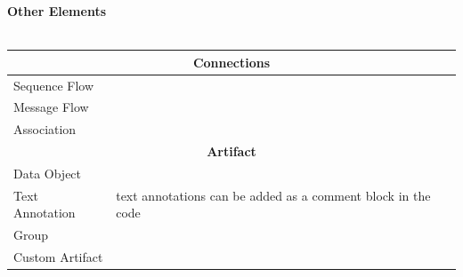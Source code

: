 	\textbf{\Large{Other Elements}}\\\\
		\begin{tabularx}{\linewidth}{|l|X|}\hline\hline
		\multicolumn{2}{|c|}{\textbf{Connections}}\\\hline\hline
		Sequence Flow & \\\hline
		Message Flow& \\\hline
		Association & \\\hline\hline
		\multicolumn{2}{|c|}{\textbf{Artifact}}\\\hline\hline
		Data Object & \\\hline
		Text Annotation & text annotations can be added as a comment block in the code \\\hline
		Group & \\\hline
		Custom Artifact & \\\hline
		\end{tabularx}\\\\